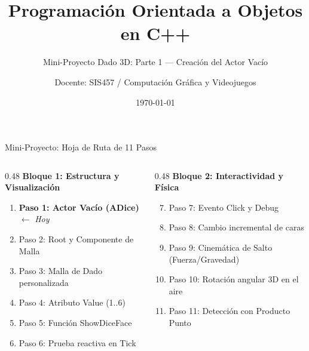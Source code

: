 \documentclass[aspectratio=169, 10pt]{beamer}
\title[POO en Unreal Engine - Parte 1]{Programación Orientada a Objetos en C++}
\subtitle{Mini-Proyecto Dado 3D: Parte 1 — Creación del Actor Vacío}
\author[SIS457]{Docente: SIS457 / Computación Gráfica y Videojuegos}
\institute[Universidad]{Carrera de Ingeniería de Sistemas}
\date{\today}
\begin{document}
\begin{frame}
    \titlepage
\end{frame}

\begin{frame}{Mini-Proyecto: Hoja de Ruta de 11 Pasos}
    \begin{columns}[T]
        \begin{column}{0.48\textwidth}
            \textbf{Bloque 1: Estructura y Visualización}
            \begin{enumerate}
                \item \textbf{\color{blue}Paso 1: Actor Vacío (ADice)} $\leftarrow$ \textit{Hoy}
                \item Paso 2: Root y Componente de Malla
                \item Paso 3: Malla de Dado personalizada
                \item Paso 4: Atributo Value (1..6)
                \item Paso 5: Función ShowDiceFace
                \item Paso 6: Prueba reactiva en Tick
            \end{enumerate}
        \end{column}
        \begin{column}{0.48\textwidth}
            \textbf{Bloque 2: Interactividad y Física}
            \begin{enumerate}
                \setcounter{enumi}{6}
                \item Paso 7: Evento Click y Debug
                \item Paso 8: Cambio incremental de caras
                \item Paso 9: Cinemática de Salto (Fuerza/Gravedad)
                \item Paso 10: Rotación angular 3D en el aire
                \item Paso 11: Detección con Producto Punto
            \end{enumerate}
        \end{column}
    \end{columns}
\end{frame}
\end{document}
